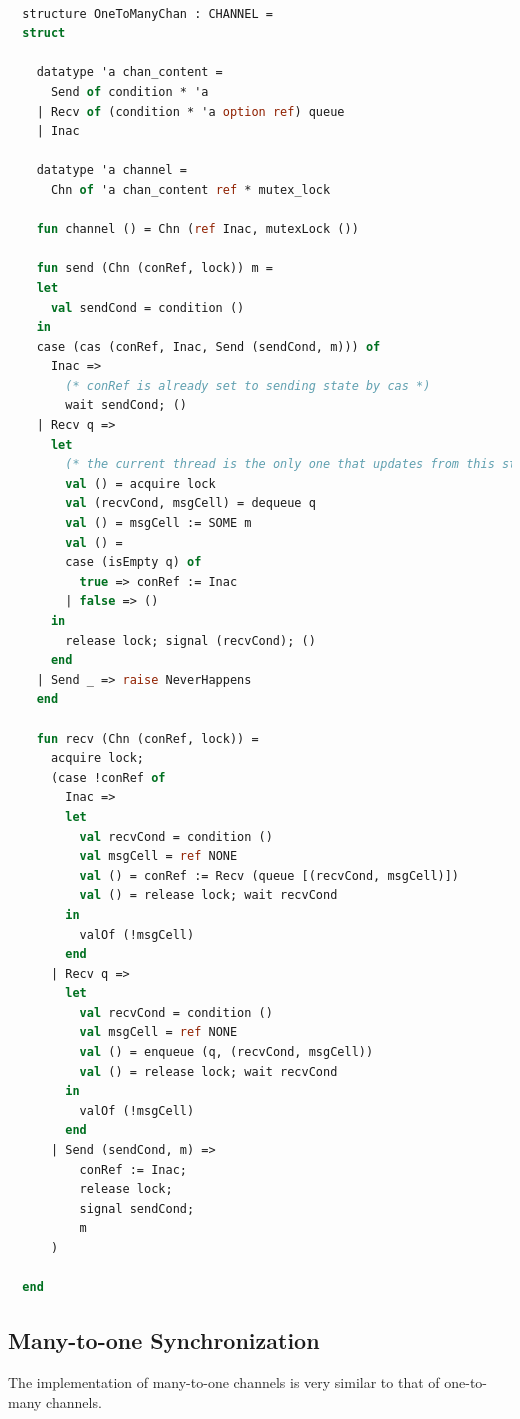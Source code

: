 \documentclass[10pt]{article}
\begin{document}
\begin{lstlisting}[language=ML, mathescape]

  structure OneToManyChan : CHANNEL =
  struct

    datatype 'a chan_content =
      Send of condition * 'a
    | Recv of (condition * 'a option ref) queue
    | Inac

    datatype 'a channel =
      Chn of 'a chan_content ref * mutex_lock

    fun channel () = Chn (ref Inac, mutexLock ())

    fun send (Chn (conRef, lock)) m =
    let
      val sendCond = condition ()
    in
    case (cas (conRef, Inac, Send (sendCond, m))) of
      Inac =>
        (* conRef is already set to sending state by cas *)
        wait sendCond; ()
    | Recv q =>
      let
        (* the current thread is the only one that updates from this state *)
        val () = acquire lock
        val (recvCond, msgCell) = dequeue q
        val () = msgCell := SOME m
        val () =
        case (isEmpty q) of
          true => conRef := Inac
        | false => ()
      in
        release lock; signal (recvCond); ()
      end
    | Send _ => raise NeverHappens
    end

    fun recv (Chn (conRef, lock)) =
      acquire lock;
      (case !conRef of
        Inac =>
        let
          val recvCond = condition ()
          val msgCell = ref NONE 
          val () = conRef := Recv (queue [(recvCond, msgCell)])
          val () = release lock; wait recvCond
        in
          valOf (!msgCell)
        end
      | Recv q =>
        let
          val recvCond = condition () 
          val msgCell = ref NONE 
          val () = enqueue (q, (recvCond, msgCell))
          val () = release lock; wait recvCond
        in
          valOf (!msgCell)
        end
      | Send (sendCond, m) =>
          conRef := Inac;
          release lock;
          signal sendCond;
          m
      ) 

  end 
\end{lstlisting}

\subsection{Many-to-one Synchronization}

The implementation of many-to-one channels is very similar to that of one-to-many channels.
\end{document}
